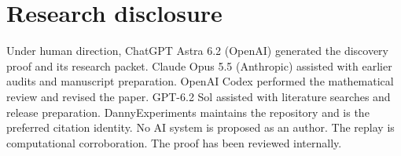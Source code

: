 \documentclass[11pt,a4paper]{amsart}
\begin{document}
\section*{Research disclosure}
Under human direction, ChatGPT Astra 6.2 (OpenAI) generated the discovery proof and its research packet. Claude Opus 5.5 (Anthropic) assisted with earlier audits and manuscript preparation. OpenAI Codex performed the mathematical review and revised the paper. GPT-6.2 Sol assisted with literature searches and release preparation. DannyExperiments maintains the repository and is the preferred citation identity. No AI system is proposed as an author. The replay is computational corroboration. The proof has been reviewed internally.



\end{document}
